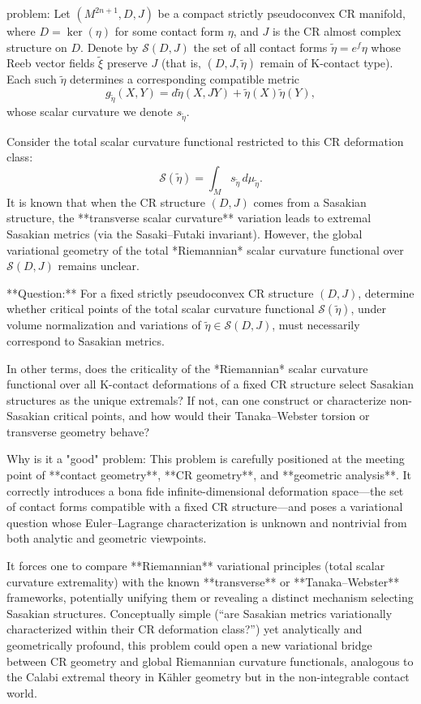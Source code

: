 problem:  
Let \((M^{2n+1}, D, J)\) be a compact strictly pseudoconvex CR manifold, where \(D = \ker(\eta)\) for some contact form \(\eta\), and \(J\) is the CR almost complex structure on \(D\). Denote by \(\mathcal{S}(D,J)\) the set of all contact forms \(\tilde{\eta} = e^{f}\eta\) whose Reeb vector fields \(\tilde{\xi}\) preserve \(J\) (that is, \((D,J,\tilde{\eta})\) remain of K-contact type). Each such \(\tilde{\eta}\) determines a corresponding compatible metric  
\[
g_{\tilde{\eta}}(X,Y) = d\tilde{\eta}(X, JY) + \tilde{\eta}(X)\tilde{\eta}(Y),
\]
whose scalar curvature we denote \(s_{\tilde{\eta}}\).  

Consider the total scalar curvature functional restricted to this CR deformation class:
\[
\mathcal{S}(\tilde{\eta}) = \int_M s_{\tilde{\eta}}\, d\mu_{\tilde{\eta}}.
\]
It is known that when the CR structure \((D, J)\) comes from a Sasakian structure, the **transverse scalar curvature** variation leads to extremal Sasakian metrics (via the Sasaki–Futaki invariant).  
However, the global variational geometry of the total *Riemannian* scalar curvature functional over \(\mathcal{S}(D,J)\) remains unclear.

**Question:**  
For a fixed strictly pseudoconvex CR structure \((D, J)\), determine whether critical points of the total scalar curvature functional \(\mathcal{S}(\tilde{\eta})\), under volume normalization and variations of \(\tilde{\eta}\in \mathcal{S}(D,J)\), must necessarily correspond to Sasakian metrics.  

In other terms, does the criticality of the *Riemannian* scalar curvature functional over all K-contact deformations of a fixed CR structure select Sasakian structures as the unique extremals?  
If not, can one construct or characterize non-Sasakian critical points, and how would their Tanaka–Webster torsion or transverse geometry behave?

Why is it a "good" problem:  
This problem is carefully positioned at the meeting point of **contact geometry**, **CR geometry**, and **geometric analysis**. It correctly introduces a bona fide infinite-dimensional deformation space—the set of contact forms compatible with a fixed CR structure—and poses a variational question whose Euler–Lagrange characterization is unknown and nontrivial from both analytic and geometric viewpoints.  

It forces one to compare **Riemannian** variational principles (total scalar curvature extremality) with the known **transverse** or **Tanaka–Webster** frameworks, potentially unifying them or revealing a distinct mechanism selecting Sasakian structures. Conceptually simple (“are Sasakian metrics variationally characterized within their CR deformation class?”) yet analytically and geometrically profound, this problem could open a new variational bridge between CR geometry and global Riemannian curvature functionals, analogous to the Calabi extremal theory in Kähler geometry but in the non-integrable contact world.